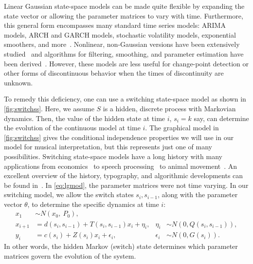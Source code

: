 \documentclass[12pt]{article}
\begin{document}
Linear Gaussian state-space models can be made quite flexible
by expanding the state vector or allowing the parameter matrices to
vary with time. Furthermore, this general form encompasses many
standard time series models: ARIMA models, ARCH and GARCH models,
stochastic volatility models, exponential smoothers, and
more~\citep[see][for many other
examples]{DurbinKoopman2001}. Nonlinear, non-Gaussian versions have
been extensively
studied~\citep{DurbinKoopman1997,Fuh2006,Kitagawa1987,Kitagawa1996}
and algorithms for filtering, smoothing, and parameter estimation have
been derived~\citep[e.g.,][]{KoyamaPerez-Bolde2010,AndrieuDoucet2010}. 
However, these models are less useful
for change-point detection or other forms of discontinuous behavior
when the times of discontinuity are unknown. 

To remedy this deficiency, one can use a switching state-space
model as shown in \autoref{fig:switchss}. Here, we assume $S$ is a
hidden, discrete process with Markovian dynamics. Then, the value of
the hidden state at time $i$, $s_i=k$ say, can determine the evolution of
the continuous model at time $i$. The graphical model in
\autoref{fig:switchss} gives the conditional independence properties
we will use in our model for musical interpretation, but this
represents just one of many possibilities. Switching state-space models have a long
history with many applications from
economics~\citep{KimNelson1998,Kim1994,Hamilton2011} to speech
processing~\citep{FoxSudderth2011} to animal
movement~\citep{PattersonThomas2008,BlockJonsen2011}. An excellent
overview of the history, typography, and algorithmic developments can
be found in~\citep{GhahramaniHinton2000}. In \eqref{eq:lgmod}, the
parameter matrices were not time varying. In our switching model, we
allow the switch states $s_i, s_{i-1}$, along with the parameter
vector $\theta$, to determine the specific dynamics at time $i$:
\begin{equation}
  \begin{aligned}
    x_1 &\sim N(x_0,\ P_0),\\
    x_{i+1}&= d(s_i,s_{i-1})+T(s_i,s_{i-1}) x_i + \eta_i, 
    & \eta_i &\sim N(0,Q(s_i,s_{i-1})),\\
    y_i&= c(s_i) + Z(s_i) x_i + \epsilon_i, & \epsilon_i &\sim N(0, G(s_i)).
  \end{aligned}
\end{equation}
In other words, the hidden Markov (switch) state determines which parameter
matrices govern the evolution of the system. 
\end{document}

